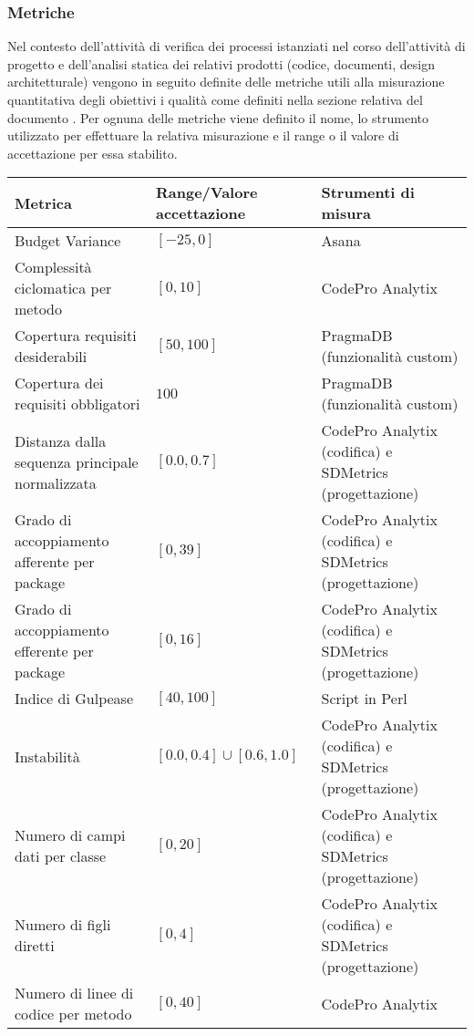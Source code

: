 \subsubsection{Metriche}
	Nel contesto dell'attività di verifica dei processi istanziati nel corso dell'attività di progetto e dell'analisi statica dei relativi prodotti (codice, documenti, design architetturale) vengono in seguito definite delle metriche utili alla misurazione quantitativa degli obiettivi i qualità come definiti nella sezione relativa del documento \PdQ.
	Per ognuna delle metriche viene definito il nome, lo strumento utilizzato per effettuare la relativa misurazione e il range o il valore di accettazione per essa stabilito.
	\begin{longtable}{|p{}|p{}|p{}|}
	\hline 
	\textbf{Metrica} & \textbf{Range/Valore accettazione} & \textbf{Strumenti di misura} \\
	\hline
	\endhead 
	Budget Variance &  $[-25, 0]$ &  Asana \\
	\hline 
	Complessità ciclomatica per metodo &  $[0, 10]$ &  CodePro Analytix \\
	\hline 
	Copertura requisiti desiderabili &  $[50, 100]$ & PragmaDB (funzionalità custom) \\
	\hline 
	Copertura dei requisiti obbligatori &  $100$ & PragmaDB (funzionalità custom) \\
	\hline 
	Distanza dalla sequenza principale normalizzata &  $[0.0, 0.7]$ &  CodePro Analytix (codifica) e SDMetrics (progettazione) \\
	\hline 
	Grado di accoppiamento afferente per package &  $[0, 39]$ &  CodePro Analytix (codifica) e SDMetrics (progettazione) \\
	\hline 
	Grado di accoppiamento efferente per package &  $[0, 16]$ &  CodePro Analytix (codifica) e SDMetrics (progettazione) \\
	\hline 
	Indice di Gulpease &  $[40, 100]$ & Script in Perl \\
	\hline 
	Instabilità &  $[0.0, 0.4] \cup [0.6, 1.0]$ &  CodePro Analytix (codifica) e SDMetrics (progettazione) \\
	\hline 
	Numero di campi dati per classe &  $[0, 20]$ &  CodePro Analytix (codifica) e SDMetrics (progettazione) \\
	\hline 
	Numero di figli diretti &  $[0, 4]$ &  CodePro Analytix (codifica) e SDMetrics (progettazione) \\
	\hline 
	Numero di linee di codice per metodo &  $[0, 40]$ &  CodePro Analytix \\

\end{longtable}
